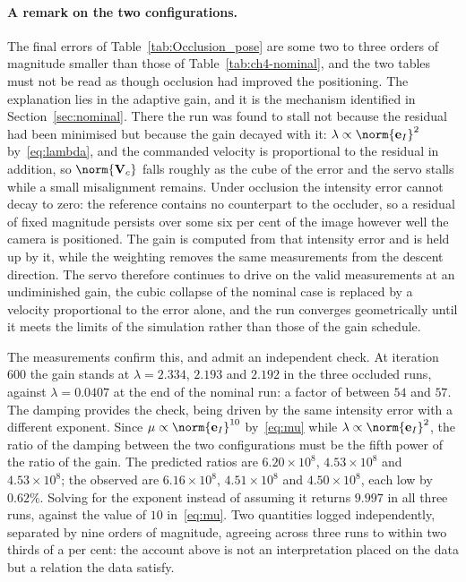 \paragraph{A remark on the two configurations.}
The final errors of Table~\ref{tab:Occlusion_pose} are some two to three
orders of magnitude smaller than those of Table~\ref{tab:ch4-nominal}, and the
two tables must not be read as though occlusion had improved the positioning.
The explanation lies in the adaptive gain, and it is the mechanism identified
in Section~\ref{sec:nominal}. There the run was found to stall not because the
residual had been minimised but because the gain decayed with it:
$\lambda\propto\norm{\mathbf{e}_I}^{2}$ by~\eqref{eq:lambda}, and the
commanded velocity is proportional to the residual in addition, so
$\norm{\mathbf{V}_c}$ falls roughly as the cube of the error and the servo
stalls while a small misalignment remains. Under occlusion the intensity error
cannot decay to zero: the reference contains no counterpart to the occluder,
so a residual of fixed magnitude persists over some six per cent of the image
however well the camera is positioned. The gain is computed from that
intensity error and is held up by it, while the weighting removes the same
measurements from the descent direction. The servo therefore continues to
drive on the valid measurements at an undiminished gain, the cubic collapse of
the nominal case is replaced by a velocity proportional to the error alone,
and the run converges geometrically until it meets the limits of the
simulation rather than those of the gain schedule.

The measurements confirm this, and admit an independent check. At
iteration~$600$ the gain stands at $\lambda=2.334$, $2.193$ and $2.192$ in the
three occluded runs, against $\lambda=0.0407$ at the end of the nominal run: a
factor of between $54$ and $57$. The damping provides the check, being driven
by the same intensity error with a different exponent. Since
$\mu\propto\norm{\mathbf{e}_I}^{10}$ by~\eqref{eq:mu} while
$\lambda\propto\norm{\mathbf{e}_I}^{2}$, the ratio of the damping between the
two configurations must be the fifth power of the ratio of the gain. The
predicted ratios are $6.20\times10^{8}$, $4.53\times10^{8}$ and
$4.53\times10^{8}$; the observed are $6.16\times10^{8}$, $4.51\times10^{8}$
and $4.50\times10^{8}$, each low by $0.62\%$. Solving for the exponent instead
of assuming it returns $9.997$ in all three runs, against the value of $10$
in~\eqref{eq:mu}. Two quantities logged independently, separated by nine
orders of magnitude, agreeing across three runs to within two thirds of a per
cent: the account above is not an interpretation placed on the data but a
relation the data satisfy.

